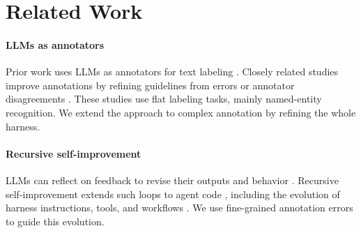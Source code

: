 \section{Related Work}
\label{sec:related}

\paragraph{LLMs as annotators}
Prior work uses LLMs as annotators for text labeling \citep{gilardi2023chatgpt,he2024annollm}. Closely related studies improve annotations by refining guidelines from errors or annotator disagreements \citep{kim2026refining,kim2026diziner}. These studies use flat labeling tasks, mainly named-entity recognition. We extend the approach to complex annotation by refining the whole harness.

\paragraph{Recursive self-improvement}
LLMs can reflect on feedback to revise their outputs and behavior \citep{madaan2023selfrefine,shinn2023reflexion}. Recursive self-improvement extends such loops to agent code \citep{zelikman2024self}, including the evolution of harness instructions, tools, and workflows \citep{lee2026metaharness,zhang2026self,lin2026agentic}. We use fine-grained annotation errors to guide this evolution.
